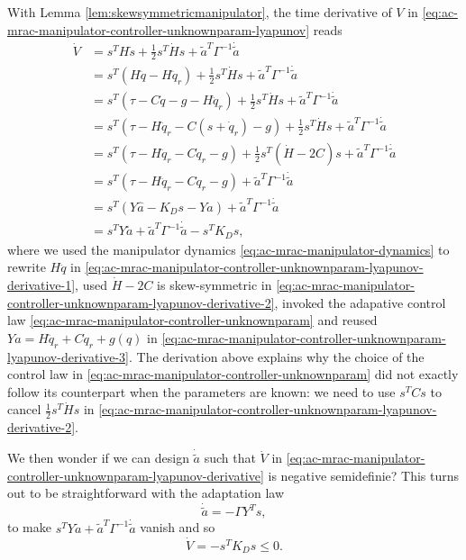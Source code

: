 \documentclass[
]{book}
\theoremstyle{definition}
\theoremstyle{definition}
\theoremstyle{definition}
\theoremstyle{definition}
\theoremstyle{remark}
\begin{document}
With Lemma \ref{lem:skewsymmetricmanipulator}, the time derivative of \(V\) in \eqref{eq:ac-mrac-manipulator-controller-unknownparam-lyapunov} reads
\begin{align}
\dot{V} & = s^T H \dot{s} + \frac{1}{2} s^T \dot{H} s + \tilde{a}^T \Gamma^{-1} \dot{\tilde{a}} \\
&= s^T (H \ddot{q} - H \ddot{q}_r) + \frac{1}{2} s^T \dot{H} s + \tilde{a}^T \Gamma^{-1} \dot{\tilde{a}} \\
&= 
s^T (\tau - C \dot{q} - g - H \ddot{q}_r ) + \frac{1}{2} s^T \dot{H} s + \tilde{a}^T \Gamma^{-1} \dot{\tilde{a}} \label{eq:ac-mrac-manipulator-controller-unknownparam-lyapunov-derivative-1} \\
&= s^T (\tau - H \ddot{q}_r - C (s + \dot{q}_r) - g) + \frac{1}{2} s^T \dot{H} s + \tilde{a}^T \Gamma^{-1} \dot{\tilde{a}} \\
&= s^T (\tau - H \ddot{q}_r - C \dot{q}_r - g) + \frac{1}{2} s^T (\dot{H}- 2C)s + \tilde{a}^T \Gamma^{-1} \dot{\tilde{a}} \label{eq:ac-mrac-manipulator-controller-unknownparam-lyapunov-derivative-2}\\
&= s^T (\tau - H \ddot{q}_r - C \dot{q}_r - g) + \tilde{a}^T \Gamma^{-1} \dot{\tilde{a}} \\
&=s^T(Y\hat{a} - K_D s - Ya) + \tilde{a}^T \Gamma^{-1} \dot{\tilde{a}} \label{eq:ac-mrac-manipulator-controller-unknownparam-lyapunov-derivative-3}\\
&=s^T Y \tilde{a} + \tilde{a}^T \Gamma^{-1} \dot{\tilde{a}} - s^T K_D s \label{eq:ac-mrac-manipulator-controller-unknownparam-lyapunov-derivative},
\end{align}
where we used the manipulator dynamics \eqref{eq:ac-mrac-manipulator-dynamics} to rewrite \(H\ddot{q}\) in \eqref{eq:ac-mrac-manipulator-controller-unknownparam-lyapunov-derivative-1}, used \(\dot{H} - 2C\) is skew-symmetric in \eqref{eq:ac-mrac-manipulator-controller-unknownparam-lyapunov-derivative-2}, invoked the adapative control law \eqref{eq:ac-mrac-manipulator-controller-unknownparam} and reused \(Ya = H \ddot{q}_r + C \dot{q}_r + g(q)\) in \eqref{eq:ac-mrac-manipulator-controller-unknownparam-lyapunov-derivative-3}. The derivation above explains why the choice of the control law in \eqref{eq:ac-mrac-manipulator-controller-unknownparam} did not exactly follow its counterpart when the parameters are known: we need to use \(s^T Cs\) to cancel \(\frac{1}{2} s^T \dot{H} s\) in \eqref{eq:ac-mrac-manipulator-controller-unknownparam-lyapunov-derivative-2}.

We then wonder if we can design \(\dot{\tilde{a}}\) such that \(\dot{V}\) in \eqref{eq:ac-mrac-manipulator-controller-unknownparam-lyapunov-derivative} is negative semidefinie? This turns out to be straightforward with the adaptation law
\begin{equation}
\dot{\tilde{a}} = -\Gamma Y^T s,
\label{eq:ac-mrac-manipulator-controller-unknownparam-adaptation-law}
\end{equation}
to make \(s^T Y \tilde{a} + \tilde{a}^T \Gamma^{-1} \dot{\tilde{a}}\) vanish and so
\[
\dot{V} = - s^T K_D s \leq 0.
\]
\end{document}
